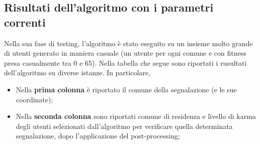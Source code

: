     \subsection{Risultati dell'algoritmo con i parametri correnti}
        Nella sua fase di testing, l'algoritmo è stato eseguito su un insieme molto grande di utenti generato in maniera casuale (un utente per ogni comune e con fitness presa casualmente tra 0 e 65). Nella tabella che segue sono riportati i rusultati dell'algoritmo su diverse istanze. In particolare, 

        \begin{itemize}
            \item Nella \textbf{prima colonna} è riportato il comune della segnalazione (e le sue coordinate);
            \item Nella \textbf{seconda colonna} sono riportati comune di residenza e livello di karma degli utenti selezionati dall'algoritmo  per verificare quella determinata segnalazione, dopo l'applicazione del post-processing;
        \end{itemize}

